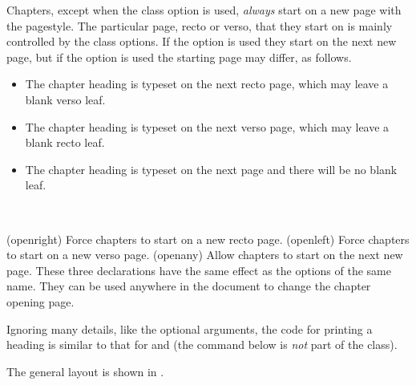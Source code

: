     Chapters, except when the  class option is used,
 \emph{always} start on a new page with the 
pagestyle. The particular page, recto or verso, that they start on is
mainly controlled by the class options. If the  option is used
they start on the next new page, but if the  option is
used the starting page may differ, as follows.
\begin{itemize}
\item[\Lopt{openright}] The chapter heading is typeset on the next recto page,
  which may leave a blank verso leaf.
\item[\Lopt{openleft}] The chapter heading is typeset on the next verso page,
  which may leave a blank recto leaf.
\item[\Lopt{openany}] The chapter heading is typeset on the next page and there
  will be no blank leaf.
\end{itemize}

\begin{syntax}
\cmd{\openright} \cmd{\openleft} \cmd{\openany} \\
\end{syntax}
\glossary(openright)%
  {}%
  {Force chapters to start on a new recto page.}
\glossary(openleft)%
  {}%
  {Force chapters to start on a new verso page.}
\glossary(openany)%
  {}%
  {Allow chapters to start on the next new page.}
These three declarations have the same effect as the options of the same name.
They can be used anywhere in the document to change the chapter opening page.

Ignoring many details, like the optional arguments, the code for
printing a \cmd{\chapter} heading is similar to that for \cmd{\book}
and \cmd{\part} (the  command below is \emph{not}
part of the class).
\begin{lcode}
\newcommand{\chapterhead}[1]{ %
  \clearforchapter        %
  \thispagestyle{chapter} %
  \insertchapterspace     %
  \chapterheadstart       %
  \printchaptername\chapternamenum\printchapternum
  \afterchapternum        %
  \printchaptertitle{#1}  %
  \afterchaptertitle}     %
\end{lcode}
The general layout is shown in .

